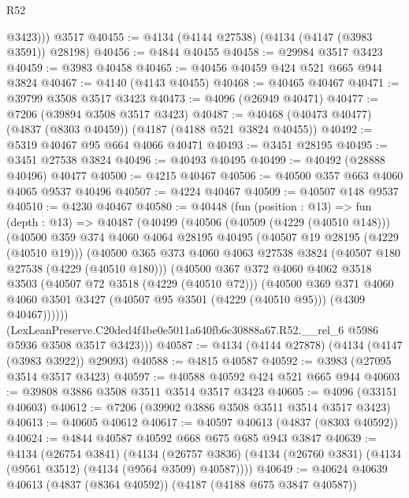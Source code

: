 \begin{lexlean}{R52}
\begin{coremodule}
          @3423)))
    @3517
@40455 := @4134 (@4144 @27538) (@4134 (@4147 (@3983 @3591)) @28198)
@40456 := @4844 @40455
@40458 := @29984 @3517 @3423
@40459 := @3983 @40458
@40465 := @40456 @40459 @424 @521 @665 @944 @3824
@40467 := @4140 (@4143 @40455)
@40468 := @40465 @40467
@40471 := @39799 @3508 @3517 @3423
@40473 := @4096 (@26949 @40471)
@40477 := @7206 (@39894 @3508 @3517 @3423)
@40487 := @40468 (@40473 @40477) (@4837 (@8303 @40459)) (@4187 (@4188 @521 @3824 @40455))
@40492 := @5319 @40467 @95 @664 @4066 @40471
@40493 := @3451 @28195
@40495 := @3451 @27538 @3824
@40496 := @40493 @40495
@40499 := @40492 (@28888 @40496) @40477
@40500 := @4215 @40467
@40506 := @40500 @357 @663 @4060 @4065 @9537 @40496
@40507 := @4224 @40467
@40509 := @40507 @148 @9537
@40510 := @4230 @40467
@40580 := @40448
    (fun (position : @13) =>
    fun (depth : @13) =>
    @40487
      (@40499
        (@40506
          (@40509 (@4229 (@40510 @148)))
          (@40500
            @359
            @374
            @4060
            @4064
            @28195
            @40495
            (@40507 @19 @28195 (@4229 (@40510 @19)))
            (@40500
              @365
              @373
              @4060
              @4063
              @27538
              @3824
              (@40507 @180 @27538 (@4229 (@40510 @180)))
              (@40500
                @367
                @372
                @4060
                @4062
                @3518
                @3503
                (@40507 @72 @3518 (@4229 (@40510 @72)))
                (@40500
                  @369
                  @371
                  @4060
                  @4060
                  @3501
                  @3427
                  (@40507 @95 @3501 (@4229 (@40510 @95)))
                  (@4309 @40467))))))
        (LexLeanPreserve.C20ded4f4be0e5011a640fb6c30888a67.R52.__rel_6
          @5986
          @5936
          @3508
          @3517
          @3423)))
@40587 := @4134 (@4144 @27878) (@4134 (@4147 (@3983 @3922)) @29093)
@40588 := @4815 @40587
@40592 := @3983 (@27095 @3514 @3517 @3423)
@40597 := @40588 @40592 @424 @521 @665 @944
@40603 := @39808 @3886 @3508 @3511 @3514 @3517 @3423
@40605 := @4096 (@33151 @40603)
@40612 := @7206 (@39902 @3886 @3508 @3511 @3514 @3517 @3423)
@40613 := @40605 @40612
@40617 := @40597 @40613 (@4837 (@8303 @40592))
@40624 := @4844 @40587 @40592 @668 @675 @685 @943 @3847
@40639 := @4134
    (@26754 @3841)
    (@4134 (@26757 @3836) (@4134 (@26760 @3831) (@4134 (@9561 @3512) (@4134 (@9564 @3509) @40587))))
@40649 := @40624 @40639 @40613 (@4837 (@8364 @40592)) (@4187 (@4188 @675 @3847 @40587))

\end{coremodule}
\end{lexlean}
